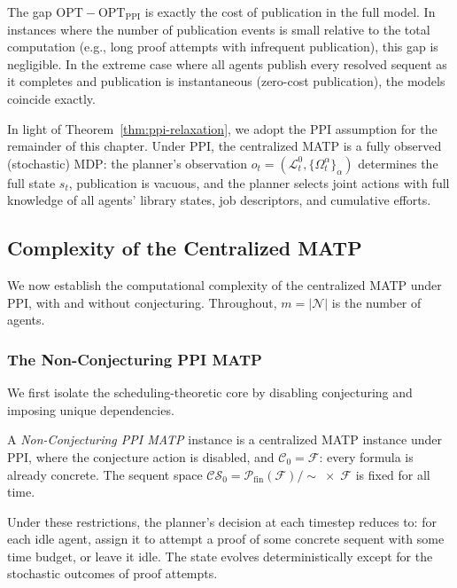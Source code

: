 \begin{remark}\label{rem:ppi-tight}
The gap $\mathrm{OPT} - \mathrm{OPT}_{\mathrm{PPI}}$ is exactly the cost of publication in the full model. In instances where the number of publication events is small relative to the total computation (e.g., long proof attempts with infrequent publication), this gap is negligible. In the extreme case where all agents publish every resolved sequent as it completes and publication is instantaneous (zero-cost publication), the models coincide exactly.
\end{remark}

In light of Theorem~\ref{thm:ppi-relaxation}, we adopt the PPI assumption for the remainder of this chapter. Under PPI, the centralized MATP is a fully observed (stochastic) MDP: the planner's observation $o_t = (\mathcal{L}^0_t, \{\Omega^\alpha_t\}_\alpha)$ determines the full state $s_t$, publication is vacuous, and the planner selects joint actions with full knowledge of all agents' library states, job descriptors, and cumulative efforts.


\subsection{Complexity of the Centralized MATP}\label{sec:complexity}

We now establish the computational complexity of the centralized MATP under PPI, with and without conjecturing. Throughout, $m = |\mathcal{N}|$ is the number of agents.


\subsubsection{The Non-Conjecturing PPI MATP}\label{sec:nc-ppi}

We first isolate the scheduling-theoretic core by disabling conjecturing and imposing unique dependencies.

\begin{definition}\label{def:nc-ppi-matp}
A \emph{Non-Conjecturing PPI MATP} instance is a centralized MATP instance under PPI, where the conjecture action is disabled, and $\mathcal{C}_0 = \mathcal{F}$: every formula is already concrete. The sequent space $\mathcal{CS}_0 = \mathcal{P}_{\mathrm{fin}}(\mathcal{F})/{\sim}\;\times\;\mathcal{F}$ is fixed for all time.
\end{definition}

Under these restrictions, the planner's decision at each timestep reduces to: for each idle agent, assign it to attempt a proof of some concrete sequent with some time budget, or leave it idle. The state evolves deterministically except for the stochastic outcomes of proof attempts.


